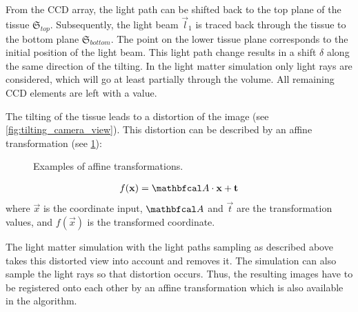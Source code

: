 From the \ac{CCD} array, the light path can be shifted back to the top plane of the tissue $\mathfrak{S}_{top}$.
Subsequently, the light beam $\vec{l}_1$ is traced back through the tissue to the bottom plane $\mathfrak{S}_{bottom}$.
The point on the lower tissue plane corresponds to the initial position of the light beam.
This light path change results in a shift $\delta$ along the same direction of the tilting.
In the light matter simulation only light rays are considered, which will go at least partially through the volume.
All remaining \ac{CCD} elements are left with a  value.
\par
%
The tilting of the tissue leads to a distortion of the image (see \cref{fig:tilting_camera_view}).
This distortion can be described by an affine transformation (see \cref{fig::affine_transformation}):
%
\begin{figure}[!t]
\centering

\caption[]{Examples of affine transformations.}
\label{fig::affine_transformation}
\end{figure}
%
\begin{align}
f(\vec{x}) = \mat{A} \cdot \vec{x} + \vec{t}
\end{align}
where $\vec{x}$ is the coordinate input, $\mat{A}$ and $\vec{t}$ are the transformation values, and $f(\vec{x})$ is the transformed coordinate.
\par
%
The light matter simulation with the light paths sampling as described above takes this distorted view into account and removes it.
The simulation can also sample the light rays so that distortion occurs.
Thus, the resulting images have to be registered onto each other by an affine transformation which is also available in the algorithm.
%
%
%
